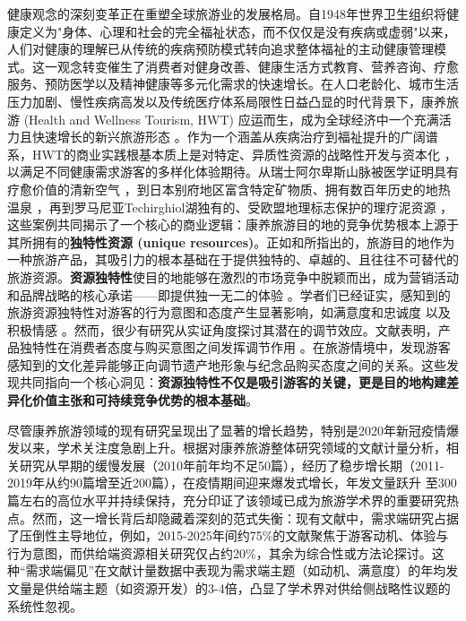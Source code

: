 \documentclass[UTF8, 12pt, a4paper, twoside]{ctexart}
\begin{document}
健康观念的深刻变革正在重塑全球旅游业的发展格局。自1948年世界卫生组织将健康定义为"身体、心理和社会的完全福祉状态，而不仅仅是没有疾病或虚弱"以来，人们对健康的理解已从传统的疾病预防模式转向追求整体福祉的主动健康管理模式。这一观念转变催生了消费者对健身改善、健康生活方式教育、营养咨询、疗愈服务、预防医学以及精神健康等多元化需求的快速增长。在人口老龄化、城市生活压力加剧、慢性疾病高发以及传统医疗体系局限性日益凸显的时代背景下，康养旅游 (Health and Wellness Tourism, HWT) 应运而生，成为全球经济中一个充满活力且快速增长的新兴旅游形态 \parencite{zhong2021medical, polat2022wellness}。作为一个涵盖从疾病治疗到福祉提升的广阔谱系，HWT的商业实践根基本质上是对特定、异质性资源的战略性开发与资本化 \parencite{pessot2021natural, alharethiChartingSustainableCourse2024a}，以满足不同健康需求游客的多样化体验期待。从瑞士阿尔卑斯山脉被医学证明具有疗愈价值的清新空气 \parencite{schmude2021geography}，到日本别府地区富含特定矿物质、拥有数百年历史的地热温泉 \parencite{medai2022factors}，再到罗马尼亚Techirghiol湖独有的、受欧盟地理标志保护的理疗泥资源 \parencite{almasanTECHIRGHIOLLAKECONTEXT2019a}，这些案例共同揭示了一个核心的商业逻辑：康养旅游目的地的竞争优势根本上源于其所拥有的\textbf{独特性资源 (unique resources)}。正如\textcite{barney1991firm}和\textcite{reitsamer2017brunner}所指出的，旅游目的地作为一种旅游产品，其吸引力的根本基础在于提供独特的、卓越的、且往往不可替代的旅游资源。\textbf{资源独特性}使目的地能够在激烈的市场竞争中脱颖而出，成为营销活动和品牌战略的核心承诺——即提供独一无二的体验 \parencite{arroyo2023unique,wangSalientHealthGoal2022c}。学者们已经证实，感知到的旅游资源独特性对游客的行为意图和态度产生显著影响，如满意度和忠诚度 \parencite{payangan2018perceived}以及积极情感 \parencite{liu2021positive}。然而，很少有研究从实证角度探讨其潜在的调节效应。文献表明，产品独特性在消费者态度与购买意图之间发挥调节作用 \parencite{fu2013product}。在旅游情境中，\textcite{wong2014cultural}发现游客感知到的文化差异能够正向调节遗产地形象与纪念品购买态度之间的关系。这些发现共同指向一个核心洞见：\textbf{资源独特性不仅是吸引游客的关键，更是目的地构建差异化价值主张和可持续竞争优势的根本基础}。

尽管康养旅游领域的现有研究呈现出了显著的增长趋势，特别是2020年新冠疫情爆发以来，学术关注度急剧上升\parencite{aluculeseiFutureTrendsMedical2021, figueiredoMappingSustainableDevelopment2024}。根据对康养旅游整体研究领域的文献计量分析，相关研究从早期的缓慢发展（2010年前年均不足50篇），经历了稳步增长期（2011-2019年从约90篇增至近200篇），在疫情期间迎来爆发式增长，年发文量跃升
至300篇左右的高位水平并持续保持，充分印证了该领域已成为旅游学术界的重要研究热点。然而，这一增长背后却隐藏着深刻的范式失衡：现有文献中，需求端研究占据了压倒性主导地位，例如，2015-2025年间约75\%的文献聚焦于游客动机、体验与行为意图，而供给端资源相关研究仅占约20\%，其余为综合性或方法论探讨。这种“需求端偏见”在文献计量数据中表现为需求端主题（如动机、满意度）的年均发文量是供给端主题（如资源开发）的3-4倍，凸显了学术界对供给侧战略性议题的系统性忽视。
\end{document}
